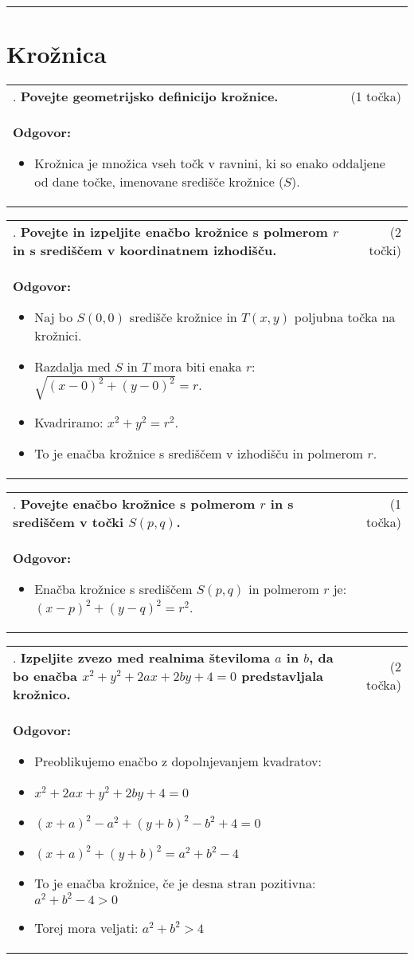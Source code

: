\documentclass[12pt]{article}
\newcounter{vprasanje}[section]
\renewcommand{\thevprasanje}{\roman{vprasanje}}
\newcommand{\vprasanje}[2]{%
  \stepcounter{vprasanje}%
  \textbf{\thevprasanje}. \textbf{#1} & (#2) \\
}
\newcommand{\odgovor}[1]{%
  \multicolumn{2}{p{\dimexpr\textwidth-2\tabcolsep\relax}}{%
    \small \textbf{Odgovor:} #1%
  } \\[1em]%
}
\newcommand{\crta}{\rule{\textwidth}{0.4pt}}
\newcommand{\naslov}[1]{%
  \vspace{1em} 
  \section{#1}
  \addcontentsline{toc}{section}{\protect\numberline{}#1}%
}
\begin{document}
\crta

\naslov{Krožnica}

\begin{tabularx}{\textwidth}{X r}
\vprasanje{Povejte geometrijsko definicijo krožnice.}{1 točka}
\odgovor{
\begin{itemize}
  \item Krožnica je množica vseh točk v ravnini, ki so enako oddaljene od dane točke, imenovane središče krožnice ($S$).
\end{itemize}
}
\end{tabularx}

\begin{tabularx}{\textwidth}{X r}
\vprasanje{Povejte in izpeljite enačbo krožnice s polmerom $r$ in s središčem v koordinatnem izhodišču.}{2 točki}
\odgovor{
\begin{itemize}
  \item Naj bo $S(0,0)$ središče krožnice in $T(x,y)$ poljubna točka na krožnici.
  \item Razdalja med $S$ in $T$ mora biti enaka $r$: $\sqrt{(x - 0)^2 + (y - 0)^2} = r$.
  \item Kvadriramo: $x^2 + y^2 = r^2$.
  \item To je enačba krožnice s središčem v izhodišču in polmerom $r$.
\end{itemize}
}
\end{tabularx}

\begin{tabularx}{\textwidth}{X r}
\vprasanje{Povejte enačbo krožnice s polmerom $r$ in s središčem v točki $S(p, q)$.}{1 točka}
\odgovor{
\begin{itemize}
  \item Enačba krožnice s središčem $S(p, q)$ in polmerom $r$ je: $(x - p)^2 + (y - q)^2 = r^2$.
\end{itemize}
}
\end{tabularx}

\begin{tabularx}{\textwidth}{X r}
\vprasanje{Izpeljite zvezo med realnima številoma $a$ in $b$, da bo enačba $x^2+y^2+2 a x+2 b y+4=0$ predstavljala krožnico.}{2 točka}
\odgovor{
\begin{itemize}
  \item Preoblikujemo enačbo z dopolnjevanjem kvadratov:
  \item $x^2 + 2a x + y^2 + 2b y + 4 = 0$
  \item $(x + a)^2 - a^2 + (y + b)^2 - b^2 + 4 = 0$
  \item $(x + a)^2 + (y + b)^2 = a^2 + b^2 - 4$
  \item To je enačba krožnice, če je desna stran pozitivna: $a^2 + b^2 - 4 > 0$
  \item Torej mora veljati: $a^2 + b^2 > 4$
\end{itemize}
}
\end{tabularx}
\end{document}
